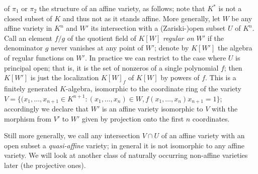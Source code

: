 \documentclass[10pt]{article}
\begin{document}
of $\pi_1$ or $\pi_2$ the structure of an affine variety, as follows;
note that $K^*$ is not a closed subset of $K$ and thus not as it stands
affine. More generally, let $W$ be any affine variety in $K^n$ and $W'$
its intersection with a (Zariski-)open subset $U$ of $K^n$. Call an
element $f/g$ of the quotient field of $K[W]$ {\sl regular on $W'$} if
the denominator $g$ never vanishes at any point of $W'$; denote by
$K[W']$ the algebra of regular functions on $W'$. In practice we can
restrict to the case where $U$ is principal open; that is, it is the set
of nonzeros of a single polynomial $f$; then $K[W']$ is just the
localization $K[W]_f$ of $K[W]$ by powers of $f$. This is a finitely
generated $K$-algebra, isomorphic to the coordinate ring of the variety
$V = \{(x_1,\ldots,x_{n+1}\in K^{n+1}: (x_1,\ldots,x_n)\in W,
f(x_1,\ldots,x_n) x_{n+1} = 1\}$; accordingly we declare that $W'$ is an
affine variety isomorphic to $V$ with the morphism from $V'$ to $W'$
given by projection onto the first $n$ coordinates.

 Still more generally, we call any intersection $V\cap U$ of an affine
 variety with an open subset a {\sl quasi-affine} variety; in general it
 is not isomorphic to any affine variety. We will look at another class
 of naturally occurring non-affine varieties later (the projective
 ones).
\end{document}
